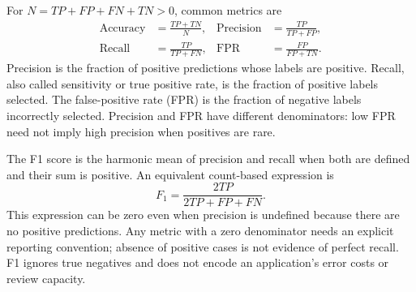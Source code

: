 \par\addvspace{\intextsep}\noindent\begin{minipage}{\linewidth}
\centering
{}
\label{fig:confusion-matrix}
\end{minipage}\par\addvspace{\intextsep}

For $N=TP+FP+FN+TN>0$, common metrics are
\begin{align*}
\operatorname{Accuracy} &= \frac{TP+TN}{N}, &
\operatorname{Precision} &= \frac{TP}{TP+FP},\\[4pt]
\operatorname{Recall} &= \frac{TP}{TP+FN}, &
\operatorname{FPR} &= \frac{FP}{FP+TN}.
\end{align*}
Precision is the fraction of positive predictions whose labels are positive. Recall, also called sensitivity or true positive rate, is the fraction of positive labels selected. The false-positive rate (FPR) is the fraction of negative labels incorrectly selected. Precision and FPR have different denominators: low FPR need not imply high precision when positives are rare.

The F1 score is the harmonic mean of precision and recall when both are defined and their sum is positive. An equivalent count-based expression is
\[
F_1=\frac{2TP}{2TP+FP+FN}.
\]
This expression can be zero even when precision is undefined because there are no positive predictions. Any metric with a zero denominator needs an explicit reporting convention; absence of positive cases is not evidence of perfect recall. F1 ignores true negatives and does not encode an application's error costs or review capacity.

